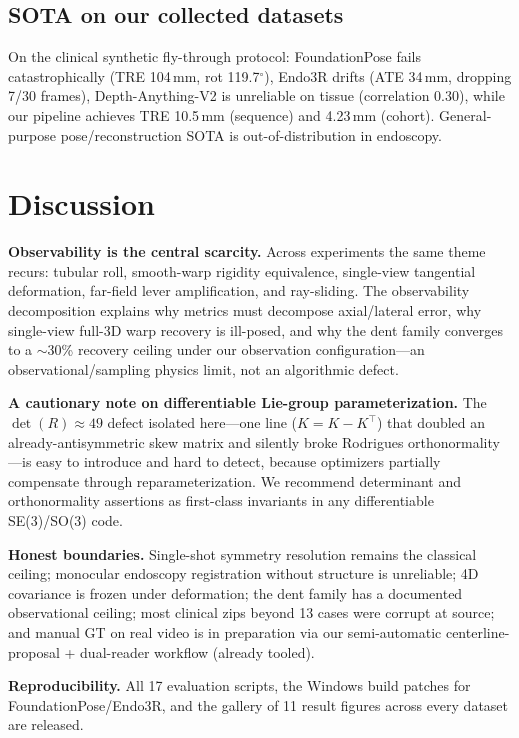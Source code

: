 \documentclass[journal]{IEEEtran}
\begin{document}
\subsection{SOTA on our collected datasets}
On the clinical synthetic fly-through protocol: FoundationPose fails catastrophically (TRE 104\,mm, rot 119.7$^{\circ}$), Endo3R drifts (ATE 34\,mm, dropping 7/30 frames), Depth-Anything-V2 is unreliable on tissue (correlation 0.30), while our pipeline achieves TRE 10.5\,mm (sequence) and 4.23\,mm (cohort). General-purpose pose/reconstruction SOTA is out-of-distribution in endoscopy.

\section{Discussion}
\textbf{Observability is the central scarcity.} Across experiments the same theme recurs: tubular roll, smooth-warp rigidity equivalence, single-view tangential deformation, far-field lever amplification, and ray-sliding. The observability decomposition explains why metrics must decompose axial/lateral error, why single-view full-3D warp recovery is ill-posed, and why the dent family converges to a $\sim$30\% recovery ceiling under our observation configuration---an observational/sampling physics limit, not an algorithmic defect.

\textbf{A cautionary note on differentiable Lie-group parameterization.} The $\det(R)\approx 49$ defect isolated here---one line ($K=K-K^{\top}$) that doubled an already-antisymmetric skew matrix and silently broke Rodrigues orthonormality---is easy to introduce and hard to detect, because optimizers partially compensate through reparameterization. We recommend determinant and orthonormality assertions as first-class invariants in any differentiable SE(3)/SO(3) code.

\textbf{Honest boundaries.} Single-shot symmetry resolution remains the classical ceiling; monocular endoscopy registration without structure is unreliable; 4D covariance is frozen under deformation; the dent family has a documented observational ceiling; most clinical zips beyond 13 cases were corrupt at source; and manual GT on real video is in preparation via our semi-automatic centerline-proposal + dual-reader workflow (already tooled).

\textbf{Reproducibility.} All 17 evaluation scripts, the Windows build patches for FoundationPose/Endo3R, and the gallery of 11 result figures across every dataset are released.
\end{document}

